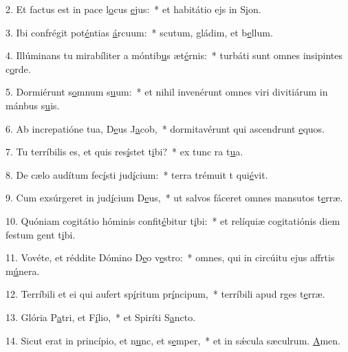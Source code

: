 2. Et factus est in pace l\uline{o}cus \uline{e}jus:~* et habitátio ejs in S\uline{i}on.\par 
3. Ibi confrégit pot\uline{é}ntias \uline{á}rcuum:~* scutum, gládim, et b\uline{e}llum.\par 
4. Illúminans tu mirabíliter a móntib\uline{u}s æt\uline{é}rnis:~* turbáti sunt omnes insipintes c\uline{o}rde.\par 
5. Dormiérunt s\uline{o}mnum s\uline{u}um:~* et nihil invenérunt omnes viri divitiárum in mánbus s\uline{u}is.\par 
6. Ab increpatióne tua, D\uline{e}us J\uline{a}cob,~* dormitavérunt qui ascendrunt \uline{e}quos.\par 
7. Tu terríbilis es, et quis res\uline{í}stet t\uline{i}bi?~* ex tunc ra t\uline{u}a.\par 
8. De cælo audítum fec\uline{í}sti jud\uline{í}cium:~* terra trémuit t qui\uline{é}vit.\par 
9. Cum exsúrgeret in jud\uline{í}cium D\uline{e}us,~* ut salvos fáceret omnes mansutos t\uline{e}rræ.\par 
10. Quóniam cogitátio hóminis confit\uline{é}bitur t\uline{i}bi:~* et relíquiæ cogitatiónis diem festum gent t\uline{i}bi.\par 
11. Vovéte, et réddite Dómino D\uline{e}o v\uline{e}stro:~* omnes, qui in circúitu ejus affrtis m\uline{ú}nera.\par 
12. Terríbili et ei qui aufert sp\uline{í}ritum pr\uline{í}ncipum,~* terríbili apud rges t\uline{e}rræ.\par 
13. Glória P\uline{a}tri, et F\uline{í}lio,~* et Spiríti S\uline{a}ncto.\par 
14. Sicut erat in princípio, et n\uline{u}nc, et s\uline{e}mper,~* et in sǽcula sæculrum. \uline{A}men.\par 
